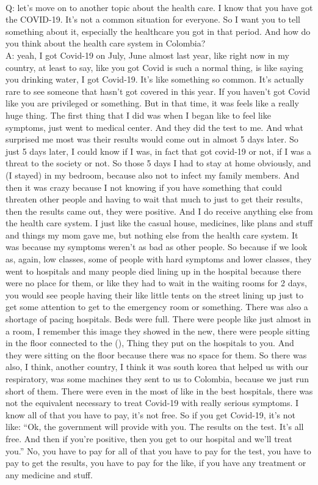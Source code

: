 \documentclass{phyasgn}\usepackage{nag}
\begin{document}
\\
Q: let's move on to another topic about the health care. I know that you have got the COVID-19. It's not a common situation for everyone. So I want you to tell something about it, especially the healthcare you got in that period. And how do you think about the health care system in Colombia?\\
A: yeah, I got Covid-19 on July, June almost last year, like right now in my country, at least to say, like you got Covid is such a normal thing, is like saying you drinking water, I got Covid-19. It's like something so common. It's actually rare to see someone that hasn't got covered in this year. If you haven't got Covid like you are privileged or something. But in that time, it was feels like a really huge thing. The first thing that I did was when I began like to feel like symptoms, just went to medical center. And they did the test to me. And what surprised me most was their results would come out in almost 5 days later. So just 5 days later, I could know if I was, in fact that got covid-19 or not, if I was a threat to the society or not. So those 5 days I had to stay at home obviously, and (I stayed) in my bedroom, because also not to infect my family members. And then it was crazy because I not knowing if you have something that could threaten other people and having to wait that much to just to get their results, then the results came out, they were positive. And I do receive anything else from the health care system. I just like the casual house, medicines, like plans and stuff and things my mom gave me, but nothing else from the health care system. It was because my symptoms weren't as bad as other people. So because if we look as, again, low classes, some of people with hard symptoms and lower classes, they went to hospitals and many people died lining up in the hospital because there were no place for them, or like they had to wait in the waiting rooms for 2 days, you would see people having their like little tents on the street lining up just to get some attention to get to the emergency room or something. There was also a shortage of pacing hospitals. Beds were full. There were people like just almost in a room, I remember this image they showed in the new, there were people sitting in the floor connected to the (), Thing they put on the hospitals to you. And they were sitting on the floor because there was no space for them. So there was also, I think, another country, I think it was south korea that helped us with our respiratory, was some machines they sent to us to Colombia, because we just run short of them. There were even in the most of like in the best hospitals, there was not the equivalent necessary to treat Covid-19 with really serious symptoms. I know all of that you have to pay, it's not free. So if you get Covid-19, it's not like: “Ok, the government will provide with you. The results on the test. It's all free. And then if you're positive, then you get to our hospital and we'll treat you.” No, you have to pay for all of that you have to pay for the test, you have to pay to get the results, you have to pay for the like, if you have any treatment or any medicine and stuff.\\
\end{document}
